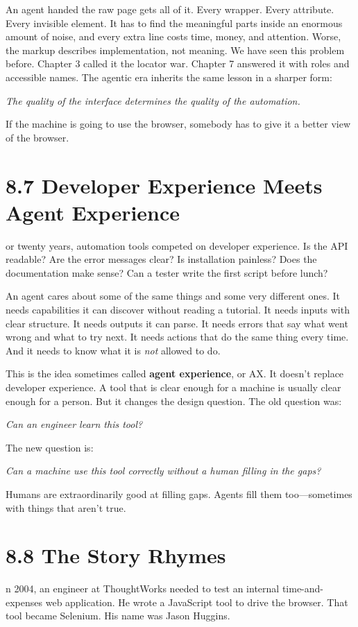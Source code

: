 \documentclass[11pt, a4paper, openany]{book}
\newcommand{\initialcap}[1]{{\fontfamily{lmss}\selectfont\huge\textbf{#1}}}
\begin{document}
An agent handed the raw page gets all of it. Every wrapper. Every attribute. Every invisible element. It has to find the meaningful parts inside an enormous amount of noise, and every extra line costs time, money, and attention. Worse, the markup describes implementation, not meaning. We have seen this problem before. Chapter 3 called it the locator war. Chapter 7 answered it with roles and accessible names. The agentic era inherits the same lesson in a sharper form:
\begin{center}
\textit{The quality of the interface determines the quality of the automation.}
\end{center}
If the machine is going to use the browser, somebody has to give it a better view of the browser.

\section{8.7 Developer Experience Meets Agent Experience}
\noindent \initialcap{F}or twenty years, automation tools competed on developer experience. Is the API readable? Are the error messages clear? Is installation painless? Does the documentation make sense? Can a tester write the first script before lunch?

An agent cares about some of the same things and some very different ones. It needs capabilities it can discover without reading a tutorial. It needs inputs with clear structure. It needs outputs it can parse. It needs errors that say what went wrong and what to try next. It needs actions that do the same thing every time. And it needs to know what it is \textit{not} allowed to do.

This is the idea sometimes called \textbf{agent experience}, or AX. It doesn't replace developer experience. A tool that is clear enough for a machine is usually clear enough for a person. But it changes the design question. The old question was:
\begin{center}
\textit{Can an engineer learn this tool?}
\end{center}
The new question is:
\begin{center}
\textit{Can a machine use this tool correctly without a human filling in the gaps?}
\end{center}
Humans are extraordinarily good at filling gaps. Agents fill them too---sometimes with things that aren't true.

\section{8.8 The Story Rhymes}
\noindent \initialcap{I}n 2004, an engineer at ThoughtWorks needed to test an internal time-and-expenses web application. He wrote a JavaScript tool to drive the browser. That tool became Selenium. His name was Jason Huggins.
\end{document}
